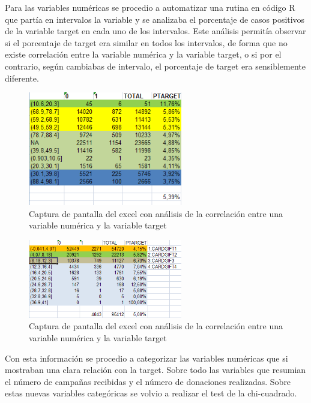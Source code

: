 Para las variables numéricas se procedio a automatizar una rutina en código R que partía en intervalos la variable y se analizaba el porcentaje de casos positivos de la variable target en cada uno de los intervalos. Este análisis permitía observar si el porcentaje de target era similar en todos los intervalos, de forma que no existe correlación entre la variable numérica y la variable target, o si por el contrario, según cambiabas de intervalo, el porcentaje de target era sensiblemente diferente.

\begin{figure}[H]
\begin{center}
\includegraphics[width=0.6\textwidth]{img/cuantitativa1}
\caption{Captura de pantalla del excel con análisis de la correlación entre una variable numérica y la variable target}
\end{center}
\end{figure}

\begin{figure}[H]
\begin{center}
\includegraphics[width=0.6\textwidth]{img/cuantitativa2}
\caption{Captura de pantalla del excel con análisis de la correlación entre una variable numérica y la variable target}
\end{center}
\end{figure}

Con esta información se procedio a categorizar las variables numéricas que si mostraban una clara relación con la target. Sobre todo las variables que resumian el número de campañas recibidas y el número de donaciones realizadas. Sobre estas nuevas variables categóricas se volvio a realizar el test de la chi-cuadrado.

